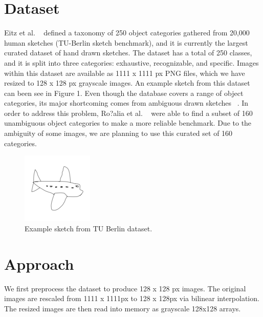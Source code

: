 \documentclass[10pt,twocolumn,letterpaper]{article}
\begin{document}
\section{Dataset}
Eitz et al. ~\cite{eitz2012hdhso} defined a taxonomy of 250 object categories gathered from 20,000 human sketches (TU-Berlin sketch benchmark), and it is currently the largest curated dataset of hand drawn sketches. The dataset has a total of 250 classes, and it is split into three categories: exhaustive, recognizable, and specific. Images within this dataset are available as 1111 x 1111 px PNG files, which we have resized to 128 x 128 px grayscale images.  An example sketch from this dataset can been see in Figure 1. Even though the database covers a range of object categories, its major shortcoming comes from ambiguous drawn sketches ~\cite{schneider2014sketch}. In order to address this problem, Ro?alia et al. ~\cite{schneider2014sketch} were able to find a subset of 160 unambiguous object categories to make a more reliable benchmark. Due to the ambiguity of some images, we are planning to use this curated set of 160 categories.




\begin{figure}[h]
	\begin{center}
	\includegraphics[width=0.5\linewidth]{airplane}
	\caption{Example sketch from TU Berlin dataset.}
	\end{center}
\end{figure}


\section{Approach}
We first preprocess the dataset to produce 128 x 128 px images. The original images are rescaled from 1111 x 1111px to 128 x 128px via bilinear interpolation. The resized images are then read into memory as grayscale 128x128 arrays.
\end{document}
